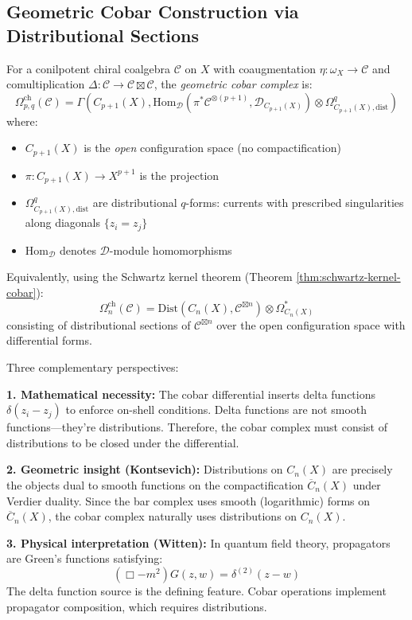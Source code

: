 \subsection{Geometric Cobar Construction via Distributional Sections}

\begin{definition}\label{def:geom-cobar}
For a conilpotent chiral coalgebra $\mathcal{C}$ on $X$ with coaugmentation 
$\eta: \omega_X \to \mathcal{C}$ and comultiplication $\Delta: \mathcal{C} \to 
\mathcal{C} \boxtimes \mathcal{C}$, the \emph{geometric cobar complex} is:
\[
\Omega^{\text{ch}}_{p,q}(\mathcal{C}) = \Gamma\left(C_{p+1}(X), \text{Hom}_{\mathcal{D}}(\pi^*\mathcal{C}^{\otimes(p+1)}, \mathcal{D}_{C_{p+1}(X)}) \otimes \Omega^q_{C_{p+1}(X),\text{dist}}\right)
\]
where:
\begin{itemize}
\item $C_{p+1}(X)$ is the \emph{open} configuration space (no compactification)
\item $\pi: C_{p+1}(X) \to X^{p+1}$ is the projection
\item $\Omega^q_{C_{p+1}(X),\text{dist}}$ are distributional $q$-forms: currents with 
prescribed singularities along diagonals $\{z_i = z_j\}$
\item $\text{Hom}_{\mathcal{D}}$ denotes $\mathcal{D}$-module homomorphisms
\end{itemize}

Equivalently, using the Schwartz kernel theorem (Theorem \ref{thm:schwartz-kernel-cobar}):
$$\Omega^{\text{ch}}_n(\mathcal{C}) = \text{Dist}\left(C_n(X), \mathcal{C}^{\boxtimes n}\right) 
\otimes \Omega^*_{C_n(X)}$$
consisting of distributional sections of $\mathcal{C}^{\boxtimes n}$ over the open 
configuration space with differential forms.
\end{definition}

\begin{remark}\label{rem:why-distributions}
Three complementary perspectives:

\textbf{1. Mathematical necessity:} The cobar differential inserts delta functions 
$\delta(z_i - z_j)$ to enforce on-shell conditions. Delta functions are not smooth 
functions—they're distributions. Therefore, the cobar complex must consist of 
distributions to be closed under the differential.

\textbf{2. Geometric insight (Kontsevich):} Distributions on $C_n(X)$ are precisely 
the objects dual to smooth functions on the compactification $\overline{C}_n(X)$ 
under Verdier duality. Since the bar complex uses smooth (logarithmic) forms on 
$\overline{C}_n(X)$, the cobar complex naturally uses distributions on $C_n(X)$.

\textbf{3. Physical interpretation (Witten):} In quantum field theory, propagators 
are Green's functions satisfying:
$$(\Box - m^2) G(z,w) = \delta^{(2)}(z - w)$$
The delta function source is the defining feature. Cobar operations implement 
propagator composition, which requires distributions.
\end{remark}

